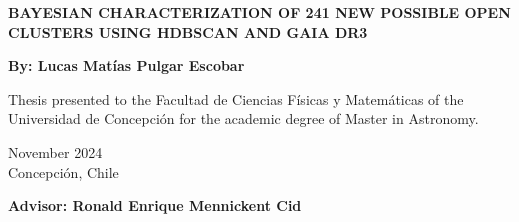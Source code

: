 
\begin{titlepage}
	
	
	\thispagestyle{frontpage}
	
	\begin{center}
		
		\vspace*{4\baselineskip}
	
		
		{\Huge \textbf{BAYESIAN CHARACTERIZATION OF 241 NEW POSSIBLE OPEN CLUSTERS USING HDBSCAN AND GAIA DR3\\}}%
		        \vspace*{1.5\baselineskip}

		\large{\textbf{By: Lucas Matías Pulgar Escobar}}\\ %
		
		\vspace{1,5\baselineskip}
		
		\large{Thesis presented to the Facultad de Ciencias Físicas y Matemáticas of the Universidad de Concepción for the academic degree of Master in Astronomy.} %
		
		\vspace{1,5\baselineskip}
		November 2024\\ %
		Concepción, Chile %
\vspace{1,5\baselineskip}

		\large{\textbf{Advisor: Ronald Enrique Mennickent Cid}}\\ %

	\end{center}
	
	\vspace*{4\baselineskip}
	
	
\end{titlepage}